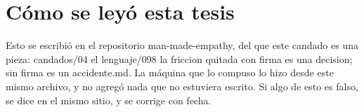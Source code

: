 \documentclass[11pt,a4paper]{article}
\begin{document}
\section*{Cómo se leyó esta tesis}
Esto se escribió en el repositorio man-made-empathy, del que este candado es una pieza: candados/04 el lenguaje/098 la friccion quitada con firma es una decision; sin firma es un accidente.md. La máquina que lo compuso lo hizo desde este mismo archivo, y no agregó nada que no estuviera escrito. Si algo de esto es falso, se dice en el mismo sitio, y se corrige con fecha.
\end{document}
